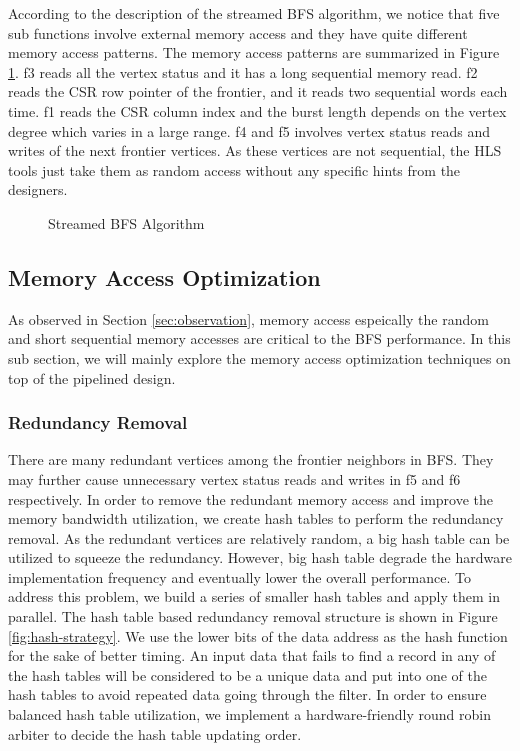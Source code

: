 According to the description of the streamed BFS algorithm, we notice that 
five sub functions involve external memory access and they have quite different 
memory access patterns. The memory access patterns are summarized in 
Figure \ref{fig:bfs-stream}. f3 reads all the vertex status and 
it has a long sequential memory read. f2 reads the CSR row pointer of the frontier, 
and it reads two sequential words each time. f1 reads the CSR column index and the 
burst length depends on the vertex degree which varies in a large range. 
f4 and f5 involves vertex status reads and writes of the next frontier vertices.
As these vertices are not sequential, the HLS tools just take them as random access 
without any specific hints from the designers. 

\begin{figure}
\caption{Streamed BFS Algorithm}
\label{fig:bfs-stream}
\end{figure}

\subsection{Memory Access Optimization}
As observed in Section \ref{sec:observation}, memory access espeically the random and 
short sequential memory accesses are critical to the 
BFS performance. In this sub section, we will mainly explore the memory 
access optimization techniques on top of the pipelined design.

\subsubsection{Redundancy Removal}
There are many redundant vertices among the frontier neighbors in BFS. 
They may further cause unnecessary vertex status reads and writes in 
f5 and f6 respectively. In order to remove the redundant memory access 
and improve the memory bandwidth utilization, we create hash tables 
to perform the redundancy removal. As the redundant vertices are 
relatively random, a big hash table can be utilized to squeeze 
the redundancy. However, big hash table degrade the hardware implementation 
frequency and eventually lower the overall performance. To address this problem, we 
build a series of smaller hash tables and apply them in parallel. 
The hash table based redundancy removal structure is shown in Figure \ref{fig:hash-strategy}. 
We use the lower bits of the data address as the hash function 
for the sake of better timing. An input data that fails to find a 
record in any of the hash tables will be considered to be a unique 
data and put into one of the hash tables to avoid repeated data 
going through the filter. In order to ensure balanced hash 
table utilization, we implement a hardware-friendly round robin 
arbiter to decide the hash table updating order. 
  
